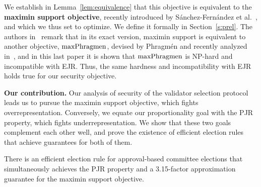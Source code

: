 We establish in Lemma~\ref{lem:equivalence} that this objective is equivalent to the \textbf{maximin support objective}, recently introduced by Sánchez-Fernández et al.~\cite{sanchez2016maximin}, and which we thus set to optimize. 
We define it formally in Section~\ref{s:prel}.
The authors in~\cite{sanchez2016maximin} remark that in its exact version, maximin support is equivalent to another objective, $\operatorname{maxPhragmen}$, devised by Phragm\'{e}n and recently analyzed in~\cite{brill2017phragmen}, and in this last paper it is shown that $\operatorname{maxPhragmen}$ is NP-hard and incompatible with EJR. 
Thus, the same hardness and incompatibility with EJR holds true for our security objective. 

\textbf{Our contribution.}
Our analysis of security of the validator selection protocol leads us to pursue the maximin support objective, which fights overrepresentation. Conversely, we equate our proportionality goal with the PJR property, which fights underrepresentation. We show that these two goals complement each other well, and prove the existence of efficient election rules that achieve guarantees for both of them. 

\begin{theorem}\label{thm:intro1}
There is an efficient election rule for approval-based committee elections that simultaneously achieves the PJR property and a 3.15-factor approximation guarantee for the maximin support objective.
\end{theorem}

